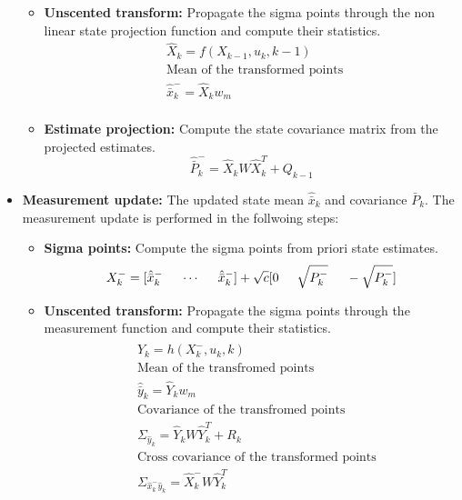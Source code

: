 \begin{itemize}
\begin{itemize}
        \item \textbf{Unscented transform:} Propagate the sigma points through the non linear state projection function and compute their statistics.
        \begin{equation}
        \begin{split}
            &\hat X_k = f(X_{k-1},u_k,k-1) \\
            &\text{Mean of the transformed points }\\
            &\hat{\bar x}^-_k = \hat X_k w_m \\
        \end{split}
        \end{equation}

        \item \textbf{Estimate projection:} Compute the state covariance matrix from the projected estimates.
        \begin{equation}
            \hat{\bar P}^-_k = \hat X_k W \hat X_k^T + Q_{k-1}
        \end{equation}

    \end{itemize}
        
    \item \textbf{Measurement update:} The updated state mean $\hat{\bar x}_k$ and covariance ${\bar P}_k$. The measurement update is performed in the follwoing steps:
    \begin{itemize}
        \item \textbf{Sigma points:} Compute the sigma points from priori state estimates.
        \begin{equation}
        X_k^- = [ \hat{\bar{x}}_k^- \hspace{5mm} \cdots \hspace{5mm} \hat{\bar{x}}_k^-]+ \sqrt c [ 0 \hspace{5mm} \sqrt{P_k^-} \hspace{5mm} - \sqrt{P_k^-} ]
        \end{equation}

        \item \textbf{Unscented transform:} Propagate the sigma points through the measurement function and compute their statistics.
        \begin{equation}
        \begin{split}
        &\hat Y_k = h(X_{k}^-,u_k,k) \\
        &\text{Mean of the transfromed points}\\
        &\hat{\bar y}_k = \hat Y_k w_m \\
        &\text{Covariance of the transfromed points}\\
        &\Sigma_{\hat y_k} = \hat Y_k W \hat Y_k^T + R_k \\
        &\text{Cross covariance of the transformed points}\\
        &\Sigma_{\hat x_k^- \hat y_k} = \hat X_k^- W \hat Y_k^T \\
        \end{split}
        \end{equation}


\end{itemize}
\end{itemize}
